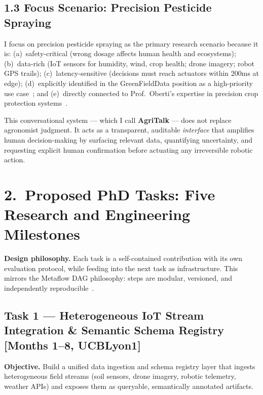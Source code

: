 \documentclass[11pt,a4paper]{article}
\begin{document}
\subsection{1.3 Focus Scenario: Precision Pesticide Spraying}

I focus on precision pesticide spraying as the primary research scenario because it is:
(a)~safety-critical (wrong dosage affects human health and ecosystems);
(b)~data-rich (IoT sensors for humidity, wind, crop health; drone imagery; robot GPS trails);
(c)~latency-sensitive (decisions must reach actuators within 200ms at edge);
(d)~explicitly identified in the GreenFieldData position as a high-priority use case~\cite{phd_adv_2026};
and (e)~directly connected to Prof.\ Oberti's expertise in precision crop protection systems~\cite{oberti_2025}.

This conversational system — which I call \textbf{AgriTalk} — does not replace agronomist judgment.
It acts as a transparent, auditable \emph{interface} that amplifies human decision-making by
surfacing relevant data, quantifying uncertainty, and requesting explicit human confirmation before
actuating any irreversible robotic action.

\section{2.\ Proposed PhD Tasks: Five Research and Engineering Milestones}

\begin{mdframed}[backgroundcolor=blue!4, linewidth=0.4pt]
\textbf{Design philosophy.} Each task is a self-contained contribution with its own evaluation
protocol, while feeding into the next task as infrastructure. This mirrors the Metaflow DAG
philosophy: steps are modular, versioned, and independently reproducible~\cite{tagliabue_metaflow_2023}.
\end{mdframed}

\subsection{Task 1 — Heterogeneous IoT Stream Integration \& Semantic Schema Registry
  \textnormal{[Months 1--8, UCBLyon1]}}

\textbf{Objective.}
Build a unified data ingestion and schema registry layer that ingests heterogeneous field streams
(soil sensors, drone imagery, robotic telemetry, weather APIs) and exposes them as queryable,
semantically annotated artifacts.
\end{document}
